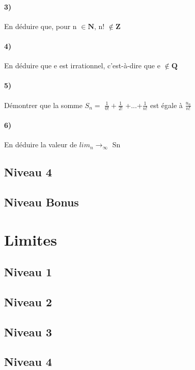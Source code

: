 \documentclass[a4paper]{report}
\begin{document}
\paragraph{3)}
En déduire que, pour n $\in \mathbf{N}$, n! $\notin\mathbf{Z}$
\paragraph{4)}
En déduire que e est irrationnel, c’est-à-dire que e $\notin \mathbf{Q}$
\paragraph{5)}
Démontrer que la somme $S_n=$ $\frac{1}{0!} +\frac{1}{2!}$ +...+$\frac{1}{n!}$ est égale à $\frac{u_n}{n!}$
\paragraph{6)}
En déduire la valeur de $lim_n\to_\infty$ Sn

			
			\subsection{Niveau 4}
			
			\subsection{Niveau Bonus}
			
		\section{Limites}
		
			\subsection{Niveau 1}
		
			\subsection{Niveau 2}
		
			\subsection{Niveau 3}
			
			\subsection{Niveau 4}
			
\end{document}
